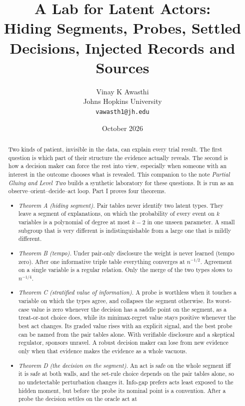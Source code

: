 \documentclass[11pt]{article}
\title{A Lab for Latent Actors:\\ Hiding Segments, Probes, Settled Decisions, Injected Records and Sources}
\author{Vinay K Awasthi\\ Johns Hopkins University\\ \texttt{vawasth1@jh.edu}}
\date{October 2026}
\theoremstyle{definition}\newtheorem{definition}{Definition}\newtheorem{remark}{Remark}
\begin{document}
\maketitle

\begin{abstract}
Two kinds of patient, invisible in the data, can explain every trial result. The first question is which part of their structure the
evidence actually reveals. The second is how a decision maker can force the rest into view, especially when someone with an interest
in the outcome chooses what is revealed. This companion to the note \emph{Partial Gluing and Level Two} \cite{PG} builds a
synthetic laboratory for these questions. It is run as an observe--orient--decide--act loop. Part I proves four theorems.
\begin{itemize}
\item \emph{Theorem A (hiding segment).} Pair tables never identify two latent types. They leave a segment of explanations, on which
  the probability of every event on $k$ variables is a polynomial of degree at most $k-2$ in one unseen parameter. A small subgroup that
  is very different is indistinguishable from a large one that is mildly different.
\item \emph{Theorem B (tempo).} Under pair-only disclosure the weight is never learned (tempo zero). After one informative triple
  table everything converges at $n^{-1/2}$. Agreement on a single variable is a regular relation. Only the merge of the two types
  slows to $n^{-1/4}$.
\item \emph{Theorem C (stratified value of information).} A probe is worthless when it touches a variable on which the types agree, and
  collapses the segment otherwise. Its worst-case value is zero whenever the decision has a saddle point on the segment, as a
  treat-or-not choice does, while its minimax-regret value stays positive whenever the best act changes. Its graded value rises with an explicit signal, and the best probe can be named from the pair
  tables alone. With verifiable disclosure and a skeptical regulator, sponsors unravel. A robust decision maker can lose from new
  evidence only when that evidence makes the evidence as a whole vacuous.
\item \emph{Theorem D (the decision on the segment).} An act is safe on the whole segment iff it is safe at both walls, and the
  set-rule choice depends on the pair tables alone, so no undetectable perturbation changes it. Info-gap prefers acts least exposed to
  the hidden moment, but before the probe its nominal point is a convention. After a probe the decision settles on the oracle act at

\end{itemize}
\end{abstract}
\end{document}
